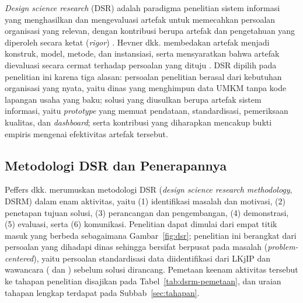 \textit{Design science research} (DSR) adalah paradigma penelitian sistem informasi yang menghasilkan dan mengevaluasi artefak untuk memecahkan persoalan organisasi yang relevan, dengan kontribusi berupa artefak dan pengetahuan yang diperoleh secara ketat (\textit{rigor}) \cite{hevner2004design}. Hevner dkk. membedakan artefak menjadi konstruk, model, metode, dan instansiasi, serta mensyaratkan bahwa artefak dievaluasi secara cermat terhadap persoalan yang dituju \cite{hevner2004design}. DSR dipilih pada penelitian ini karena tiga alasan: persoalan penelitian berasal dari kebutuhan organisasi yang nyata, yaitu dinas yang menghimpun data UMKM tanpa kode lapangan usaha yang baku; solusi yang diusulkan berupa artefak sistem informasi, yaitu \textit{prototype} yang memuat pendataan, standardisasi, pemeriksaan kualitas, dan \textit{dashboard}; serta kontribusi yang diharapkan mencakup bukti empiris mengenai efektivitas artefak tersebut.

\subsection{Metodologi DSR dan Penerapannya}
\label{sec:dsrm}

Peffers dkk. \cite{peffers2007dsrm} merumuskan metodologi DSR (\textit{design science research methodology}, DSRM) dalam enam aktivitas, yaitu (1) identifikasi masalah dan motivasi, (2) penetapan tujuan solusi, (3) perancangan dan pengembangan, (4) demonstrasi, (5) evaluasi, serta (6) komunikasi. Penelitian dapat dimulai dari empat titik masuk yang berbeda sebagaimana Gambar~\ref{fig:dsr}; penelitian ini berangkat dari persoalan yang dihadapi dinas sehingga bersifat berpusat pada masalah (\textit{problem-centered}), yaitu persoalan standardisasi data diidentifikasi dari LKjIP dan wawancara (\lampkadis{} dan \lampstaf) sebelum solusi dirancang. Pemetaan keenam aktivitas tersebut ke tahapan penelitian disajikan pada Tabel~\ref{tab:dsrm-pemetaan}, dan uraian tahapan lengkap terdapat pada Subbab~\ref{sec:tahapan}.

